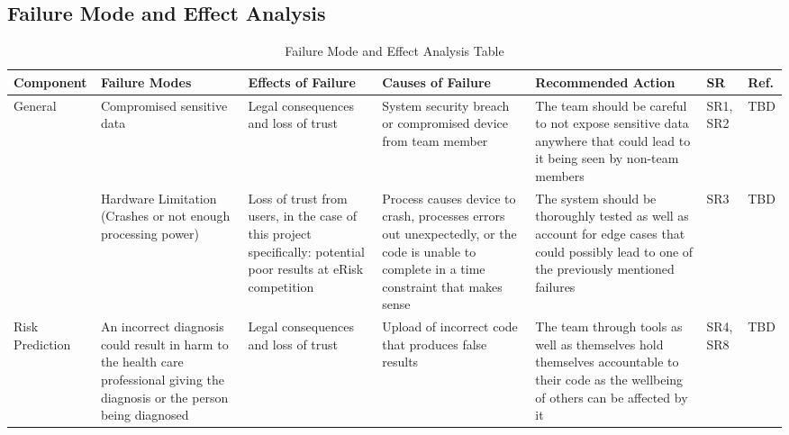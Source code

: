 \documentclass{article}
\begin{document}

\begin{landscape}
    \section{Failure Mode and Effect Analysis}
    \begin{longtable}{|p{}|p{}|p{}|p{}|p{}|p{}|p{}|}
        \caption{Failure Mode and Effect Analysis Table} \\
        \hline
        \textbf{Component} & \textbf{Failure Modes} & \textbf{Effects of Failure} & \textbf{Causes of Failure} & \textbf{Recommended Action} & \textbf{SR} & \textbf{Ref.} \\
        \hline
        \multirow{2}{*}{General} 
        & Compromised sensitive data
        & Legal consequences and loss of trust 
        & System security breach or compromised device from team member 
        & The team should be careful to not expose sensitive data anywhere that could lead to it being seen by non-team members 
        & SR1, SR2
        & TBD \\
        \cline{2-7}
        & Hardware Limitation (Crashes or not enough processing power)
        & Loss of trust from users, in the case of this project specifically: potential poor results at eRisk competition
        & Process causes device to crash, processes errors out unexpectedly, or the code is unable to complete in a time constraint that makes sense 
        & The system should be thoroughly tested as well as account for edge cases that could possibly lead to one of the previously mentioned failures  
        & SR3 
        & TBD \\
        \hline
        \multirow{1}{*}{Risk Prediction} 
        & An incorrect diagnosis could result in harm to the health care professional giving the diagnosis or the person being diagnosed
        & Legal consequences and loss of trust 
        & Upload of incorrect code that produces false results
        & The team through tools as well as themselves hold themselves accountable to their code as the wellbeing of others can be affected by it
        & SR4, SR8
        & TBD \\
        \hline
    \end{longtable}
\end{landscape}
\end{document}
